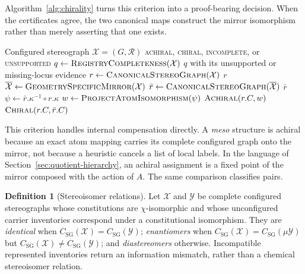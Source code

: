 \documentclass[pdflatex,sn-mathphys-num,referee,lineno]{sn-jnl}
\theoremstyle{plain}
\theoremstyle{remark}
\theoremstyle{definition}
\newtheorem{definition}{Definition}
\begin{document}
Algorithm~\ref{alg:chirality} turns this criterion into a proof-bearing
decision.  When the certificates agree, the two canonical maps construct the
mirror isomorphism rather than merely asserting that one exists.

\begin{algorithm}[htbp]
\caption{Exact whole-molecule chirality by mirror canonicalization}
\label{alg:chirality}
\begin{algorithmic}[1]
\Require Configured stereograph \(\mathcal X=(G,\mathcal R)\)
\Ensure \textsc{achiral}, \textsc{chiral}, \textsc{incomplete}, or \textsc{unsupported}
\State \(q\gets\Call{RegistryCompleteness}{\mathcal X}\)
  \State \Return \(q\) with its unsupported or missing-locus evidence
\EndIf
\State \(r\gets\Call{CanonicalStereoGraph}{\mathcal X}\)
 \State \Return \(r\) \EndIf
\State \(\overline{\mathcal X}\gets\Call{GeometrySpecificMirror}{\mathcal X}\)
\State \(\bar r\gets\Call{CanonicalStereoGraph}{\overline{\mathcal X}}\)
 \State \Return \(\bar r\) \EndIf
{}
  \State \(\psi\gets\bar r.\kappa^{-1}\circ r.\kappa\)
  \State \(w\gets\Call{ProjectAtomIsomorphism}{\psi}\)
  \State \Return \(\Call{Achiral}{r.C,w}\)
\Else
  \State \Return \(\Call{Chiral}{r.C,\bar r.C}\)
\EndIf
\end{algorithmic}
\end{algorithm}

This criterion handles internal compensation directly.  A \emph{meso}
structure is achiral because an exact atom mapping carries its complete
configured graph onto the mirror, not because a heuristic cancels a list of
local labels.  In the language of Section~\ref{sec:quotient-hierarchy}, an
achiral assignment is a fixed point of the mirror composed with the action of
\(A\).  The same comparison classifies pairs.

\begin{definition}[Stereoisomer relations]
\label{def:stereoisomer-relations}
Let \(\mathcal X\) and \(\mathcal Y\) be complete configured stereographs whose
constitutions are \(\chi\)-isomorphic and whose unconfigured carrier inventories
correspond under a constitutional isomorphism. They are
\emph{identical} when \(C_{\mathrm{SG}}(\mathcal X)=C_{\mathrm{SG}}(\mathcal
Y)\);
\emph{enantiomers} when
\(C_{\mathrm{SG}}(\mathcal X)=C_{\mathrm{SG}}(\mu\mathcal Y)\) but
\(C_{\mathrm{SG}}(\mathcal X)\neq C_{\mathrm{SG}}(\mathcal Y)\);
and \emph{diastereomers} otherwise. Incompatible represented inventories
return an information mismatch, rather than a chemical stereoisomer relation.
\end{definition}
\end{document}
